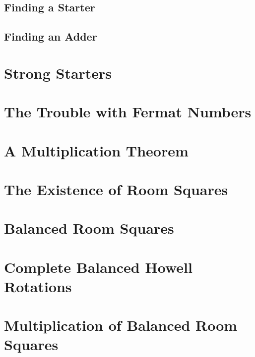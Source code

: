 \documentclass[a4paper, draft]{book}
\begin{document}
  \section{Finding a Starter}
    
  \section{Finding an Adder}
    

\chapter{Strong Starters}
  \label{ch:strong-starters}
  
  

\chapter{The Trouble with Fermat Numbers}
  \label{ch:trouble-fermat}
  

\chapter{A Multiplication Theorem}
  \label{ch:multiplication-theorem}
  
  

\chapter{The Existence of Room Squares}
  \label{ch:existence-theorem}
  
  

\chapter{Balanced Room Squares}
  \label{ch:balanced-room-squares}
  

\chapter{Complete Balanced Howell Rotations}
  \label{ch:cbhr}
  
  

\chapter{Multiplication of Balanced Room Squares}
  \label{ch:brs-multiplication}
  
\end{document}
